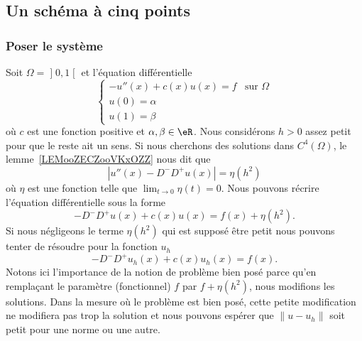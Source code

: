 \subsection{Un schéma à cinq points}

\subsubsection{Poser le système}

Soit \( \Omega=\mathopen] 0 , 1 \mathclose[\) et l'équation différentielle
	\begin{equation}        \label{EQooXJBWooRhCsLy}
		\begin{cases}
			-u''(x)+c(x)u(x)=f & \text{sur } \Omega \\
			u(0)=\alpha                             \\
			u(1)=\beta
		\end{cases}
	\end{equation}
	où \( c\) est une fonction positive et \( \alpha,\beta\in \eR\). Nous considérons \( h>0\) assez petit pour que le reste ait un sens. Si nous cherchons des solutions dans \( C^4(\Omega)\), le lemme~\ref{LEMooZECZooVKxOZZ} nous dit que
	\begin{equation}
		| u''(x)-D^-D^+u(x) |=\eta(h^2)
	\end{equation}
	où \( \eta\) est une fonction telle que \( \lim_{t\to 0} \eta(t)=0\). Nous pouvons récrire l'équation différentielle sous la forme
	\begin{equation}
		-D^-D^+u(x)+c(x)u(x)=f(x)+\eta(h^2).
	\end{equation}
	Si nous négligeons le terme \( \eta(h^2)\) qui est supposé être petit nous pouvons tenter de résoudre pour la fonction \( u_h\)
	\begin{equation}
		-D^-D^+u_h(x)+c(x)u_h(x)=f(x).
	\end{equation}
	Notons ici l'importance de la notion de problème bien posé parce qu'en remplaçant le paramètre (fonctionnel) \( f\) par \( f+\eta(h^2)\), nous modifions les solutions. Dans la mesure où le problème est bien posé, cette petite modification ne modifiera pas trop la solution et nous pouvons espérer que \( \| u-u_h \|\) soit petit pour une norme ou une autre.

